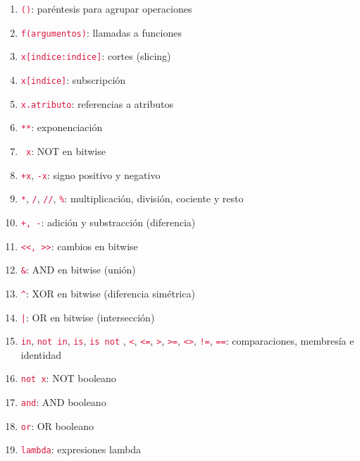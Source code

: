 \documentclass{report}
\newcommand{\ttt}[1]{\textcolor{Crimson}{\texttt{#1}}}
\begin{document}
\begin{enumerate}
  \item \ttt{()}: paréntesis para agrupar operaciones
  
  \item \ttt{f(argumentos)}: llamadas a funciones
  
  \item \ttt{x[indice:indice]}: cortes (slicing)
  
  \item \ttt{x[indice]}: subscripción
  
  \item \ttt{x.atributo}: referencias a atributos
  
  \item \ttt{**}: exponenciación
  
  \item \ttt{~x}: NOT en bitwise
  
  \item \ttt{+x}, \ttt{-x}: signo positivo y negativo
  
  \item \ttt{*}, \ttt{/}, \ttt{//}, \ttt{\%}: multiplicación, división, cociente y resto
  
  \item \ttt{+, -}: adición y substracción (diferencia)
  
  \item \ttt{<<, >>}: cambios en bitwise
  
  \item \ttt{\&}: AND en bitwise (unión)
  
  \item \ttt{\^}: XOR en bitwise (diferencia simétrica)
  
  \item \ttt{|}: OR en bitwise (intersección)
  
  \item \ttt{in}, \ttt{not in}, \ttt{is}, \ttt{is not} , \ttt{<}, \ttt{<=}, \ttt{>}, \ttt{>=}, \ttt{<>}, \ttt{!=}, \ttt{==}: comparaciones, membresía e identidad
  
  \item \ttt{not x}: NOT booleano
  
  \item \ttt{and}: AND booleano
  
  \item \ttt{or}: OR booleano
  
  \item \ttt{lambda}: expresiones lambda

\end{enumerate}
\end{document}
